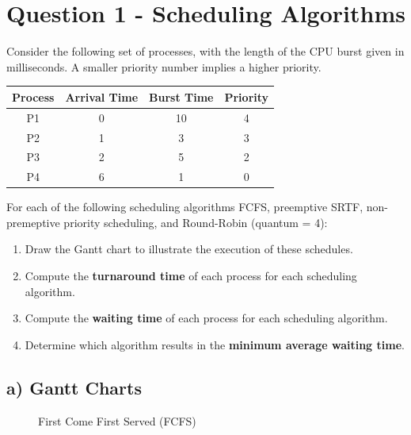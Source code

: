 \documentclass[../main.tex]{subfiles}
\begin{document}
\section{Question 1 - Scheduling Algorithms}

Consider the following set of processes, with the length of the CPU burst given in milliseconds.  
A smaller priority number implies a higher priority.

\begin{table}[h!]
\centering
\begin{tabular}{|c|c|c|c|}
\hline
\textbf{Process} & \textbf{Arrival Time} & \textbf{Burst Time} & \textbf{Priority} \\
\hline
P1 & 0 & 10 & 4 \\
P2 & 1 & 3 & 3 \\
P3 & 2 & 5 & 2 \\
P4 & 6 & 1 & 0 \\
\hline
\end{tabular}
\end{table}

For each of the following scheduling algorithms FCFS, preemptive SRTF, non-premeptive priority scheduling, and Round-Robin (quantum = 4):

\begin{enumerate}[label=\alph*)]
    \item Draw the Gantt chart to illustrate the execution of these schedules.
    \item Compute the \textbf{turnaround time} of each process for each scheduling algorithm.
    \item Compute the \textbf{waiting time} of each process for each scheduling algorithm.
    \item Determine which algorithm results in the \textbf{minimum average waiting time}.
\end{enumerate}

\solution

\subsection*{a) Gantt Charts}

\begin{figure}[H]
    \centering
    \caption{First Come First Served (FCFS)}
\end{figure}
\end{document}
